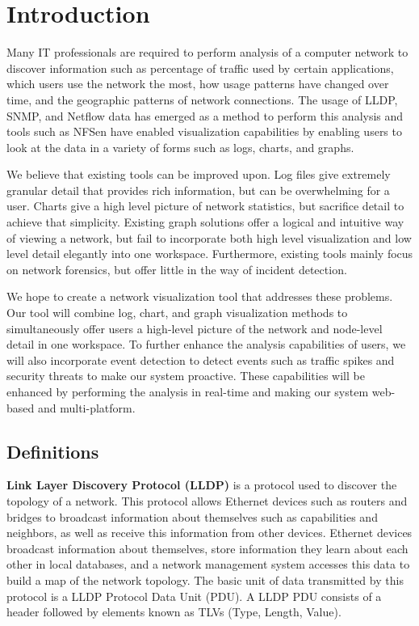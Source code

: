 \documentclass{sig-alternate}
\begin{document}
\section{Introduction}

Many IT professionals are required to perform analysis of a computer network to
discover information such as percentage of traffic used by certain applications,
which users use the network the most, how usage patterns have changed over time,
and the geographic patterns of network connections. The usage of LLDP, SNMP, and
Netflow data has emerged as a method to perform this analysis and tools such as
NFSen have enabled visualization capabilities by enabling users to look at the
data in a variety of forms such as logs, charts, and graphs.

We believe that existing tools can be improved upon. Log files give extremely
granular detail that provides rich information, but can be overwhelming for a
user. Charts give a high level picture of network statistics, but sacrifice
detail to achieve that simplicity. Existing graph solutions offer a logical and
intuitive way of viewing a network, but fail to incorporate both high level
visualization and low level detail elegantly into one workspace. Furthermore,
existing tools mainly focus on network forensics, but offer little in the way of
incident detection.

We hope to create a network visualization tool that addresses these problems.
Our tool will combine log, chart, and graph visualization methods to
simultaneously offer users a high-level picture of the network and node-level
detail in one workspace. To further enhance the analysis capabilities of users,
we will also incorporate event detection to detect events such as traffic spikes
and security threats to make our system proactive. These capabilities will be
enhanced by performing the analysis in real-time and making our system web-based
and multi-platform.

\subsection{Definitions}

\textbf{Link Layer Discovery Protocol (LLDP)} is a protocol used to discover the
topology of a network. This protocol allows Ethernet devices such as routers and
bridges to broadcast information about themselves such as capabilities and
neighbors, as well as receive this information from other devices.  Ethernet
devices broadcast information about themselves, store information they learn
about each other in local databases, and a network management system accesses
this data to build a map of the network topology. The basic unit of data
transmitted by this protocol is a LLDP Protocol Data Unit (PDU). A LLDP PDU
consists of a header followed by elements known as TLVs (Type, Length, Value).
\end{document}
